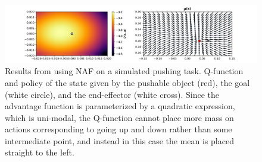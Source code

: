 \begin{figure}[h!]
    \centering
    \includegraphics[width=1.0 \textwidth]{res/naf_sim_unimode_q.pdf}

    \caption{Results from using NAF on a simulated pushing task. Q-function and
    policy of the state given by the pushable object (red), the goal (white
    circle), and the end-effector (white cross). Since the advantage function
    is parameterized by a quadratic expression, which is uni-modal, the
    Q-function cannot place more mass on actions corresponding to going up and
    down rather than some intermediate point, and instead in this case the mean
    is placed straight to the left.}

    \label{fig:naf_sim_unimode_q}
\end{figure}
